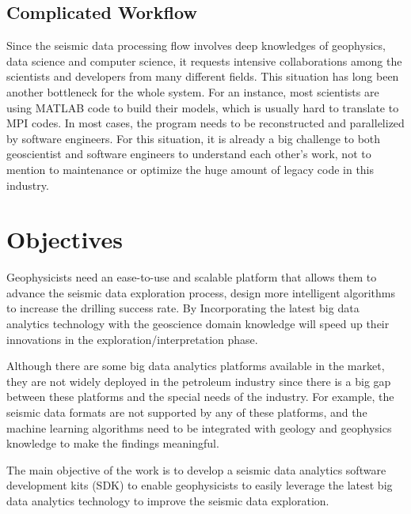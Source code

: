 \subsection{Complicated Workflow}
Since the seismic data processing flow involves deep knowledges of geophysics, data science and computer science, it requests intensive collaborations among the scientists and developers from many different fields. This situation has long been another bottleneck for the whole system. For an instance, most scientists are using MATLAB code to build their models, which is usually hard to translate to MPI codes. In most cases, the program needs to be reconstructed and parallelized by software engineers. For this situation, it is already a big challenge to both geoscientist and software engineers to understand each other's work, not to mention to maintenance or optimize the huge amount of legacy code in this industry.


\section{Objectives}

Geophysicists need an ease-to-use and scalable platform that allows them to advance the seismic data exploration process, design more intelligent algorithms to increase the drilling success rate. By Incorporating the latest big data analytics technology with the geoscience domain knowledge will speed up their innovations in the exploration/interpretation phase.

Although there are some big data analytics platforms available in the market, they are not widely deployed in the petroleum industry since there is a big gap between these platforms and the special needs of the industry. For example, the seismic data formats are not supported by any of these platforms, and the machine learning algorithms need to be integrated with geology and geophysics knowledge to make the findings meaningful.

The main objective of the work is to develop a seismic data analytics software development kits (SDK) to enable geophysicists to easily leverage the latest big data analytics technology to improve the seismic data exploration.




